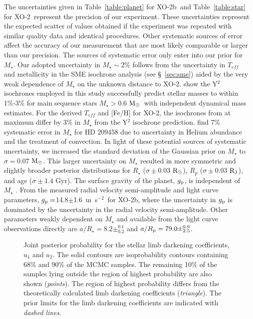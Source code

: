 \documentclass{emulateapj}
\newcommand{\mpstwo}{m~s$^{-2}$}
\newcommand{\Msun}{${\rm M_\odot}$}
\newcommand{\Rsun}{${\rm R_\odot}$}
\newcommand{\xonb}{XO-2b}
\newcommand{\xon}{XO-2}
\newcommand{\Rjup}{${\rm R_J}$}
\newcommand{\vgp}{14.8}
\newcommand{\egp}{1.6}
\begin{document}
The uncertainties given in Table~\ref{table:planet} for \xonb\ and
Table~\ref{table:star} for \xon\ represent the precision of our
experiment.  These uncertainties represent the expected scatter of
values obtained if the experiment was repeated with similar quality
data and identical procedures.  Other systematic sources of error
affect the accuracy of our measurement that are most likely comparable
or larger than our precision.  The sources of systematic error only
enter into our prior for $M_{\star}$.  Our adopted uncertainty in
$M_{\star}\sim$2\% follows from the uncertainty in $T_{eff}$ and
metallicity in the SME isochrone analysis (see \S~\ref{sec:sme}) aided
by the very weak dependence of $M_{\star}$ on the unknown distance to
\xon.  \citet{HIL04} show the Y$^{2}$ isochrones employed in this
study successfully predict stellar masses to within 1\%-3\% for main
sequence stars $M_{\star}>0.6$ \Msun\ with independent dynamical mass
estimates.  For the derived $T_{eff}$ and [Fe/H] for \xon, the
isochrones from \citet{GIR02} at maximum differ by 3\% in $M_{\star}$
from the Y$^{2}$ isochrone prediction.  \citet{COD02} find 7\%
systematic error in $M_{\star}$ for HD 209458 due to uncertainty in
Helium abundance and the treatment of convection.  In light of these
potential sources of systematic uncertainty, we increased the standard
deviation of the Gaussian prior on $M_{\star}$ to $\sigma=0.07$ \Msun.
This larger uncertainty on $M_{\star}$ resulted in more symmetric and
slightly broader posterior distributions for $R_{\star}$ ($\sigma \pm
0.03$ \Rsun), $R_{p}$ ($\sigma \pm 0.03$ \Rjup), and age ($\sigma \pm
1.4$ Gyr).  The surface gravity of the planet, $g_{\rm p}$, is independent
of $M_{\star}$ \citep{SOU07}.  From the measured radial velocity
semi-amplitude and light curve parameters, $g_{\rm p}=$\vgp $\pm$\egp\ \mpstwo\
for \xonb, where the uncertainty in $g_{\rm p}$ is dominated by the uncertainty
in the radial velocity semi-amplitude.  Other parameters weakly
dependent on $M_{\star}$ and available from the light curve
observations directly are $a/R_{\star}=8.2\pm^{0.1}_{0.2}$ and
$a/R_{\rm p}=79.0\pm^{0.9}_{2.5}$.

\begin{figure}
\caption{ Joint posterior
probability for the stellar limb darkening coefficients, $u_{1}$ and
$u_{2}$.  The
solid contours are isoprobability contours containing 68\% and 90\% of
the MCMC samples.  The remaining 10\% of the samples lying outside the
region of highest probability are also shown ({\it points}).
The region of highest probability differs from the theoretically calculated limb darkening
coefficients ({\it triangle}).  The prior limits for the limb
darkening coefficients are indicated with {\it dashed lines}.\label{limbcontour}}
\end{figure}
\end{document}
